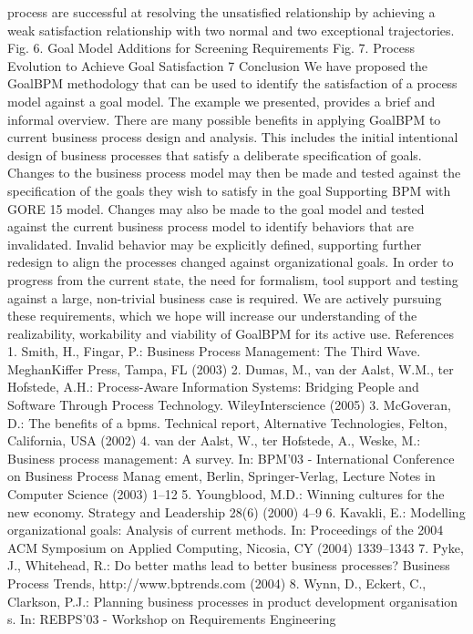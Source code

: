 process are successful at resolving the unsatisfied relationship by achieving a
weak satisfaction relationship with two normal and two exceptional trajectories.
Fig. 6. Goal Model Additions for Screening Requirements
Fig. 7. Process Evolution to Achieve Goal Satisfaction
7 Conclusion
We have proposed the GoalBPM methodology that can be used to identify the
satisfaction of a process model against a goal model. The example we presented,
provides a brief and informal overview. There are many possible benefits in applying GoalBPM to current business process design and analysis. This includes
the initial intentional design of business processes that satisfy a deliberate specification of goals. Changes to the business process model may then be made
and tested against the specification of the goals they wish to satisfy in the goal
Supporting BPM with GORE 15
model. Changes may also be made to the goal model and tested against the
current business process model to identify behaviors that are invalidated. Invalid behavior may be explicitly defined, supporting further redesign to align
the processes changed against organizational goals. In order to progress from
the current state, the need for formalism, tool support and testing against a
large, non-trivial business case is required. We are actively pursuing these requirements, which we hope will increase our understanding of the realizability,
workability and viability of GoalBPM for its active use.
References
1. Smith, H., Fingar, P.: Business Process Management: The Third Wave. MeghanKiffer Press, Tampa, FL (2003)
2. Dumas, M., van der Aalst, W.M., ter Hofstede, A.H.: Process-Aware Information Systems: Bridging People and Software Through Process Technology. WileyInterscience (2005)
3. McGoveran, D.: The benefits of a bpms. Technical report, Alternative Technologies, Felton, California, USA (2002)
4. van der Aalst, W., ter Hofstede, A., Weske, M.: Business process management: A
survey. In: BPM’03 - International Conference on Business Process Manag ement,
Berlin, Springer-Verlag, Lecture Notes in Computer Science (2003) 1–12
5. Youngblood, M.D.: Winning cultures for the new economy. Strategy and Leadership 28(6) (2000) 4–9
6. Kavakli, E.: Modelling organizational goals: Analysis of current methods. In:
Proceedings of the 2004 ACM Symposium on Applied Computing, Nicosia, CY
(2004) 1339–1343
7. Pyke, J., Whitehead, R.: Do better maths lead to better business processes? Business Process Trends, http://www.bptrends.com (2004)
8. Wynn, D., Eckert, C., Clarkson, P.J.: Planning business processes in product development organisation s. In: REBPS’03 - Workshop on Requirements Engineering
